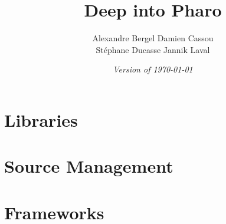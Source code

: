 \documentclass[a4paper,10pt,twoside]{book}
\begin{document}
\frontmatter
\setcounter{page}{1}
\pagestyle{headings}
\author{
	Alexandre Bergel\quad 
	Damien Cassou\quad \\
	St\'ephane Ducasse\quad
	Jannik Laval\quad}
\title{\Huge\bf Deep into Pharo}
\isodate
\date{\emph{Version of \today}}
\maketitle
\tableofcontents
\sloppy %
\mainmatter






\part{Libraries}



 









\part{Source Management}






\part{Frameworks}
\end{document}

